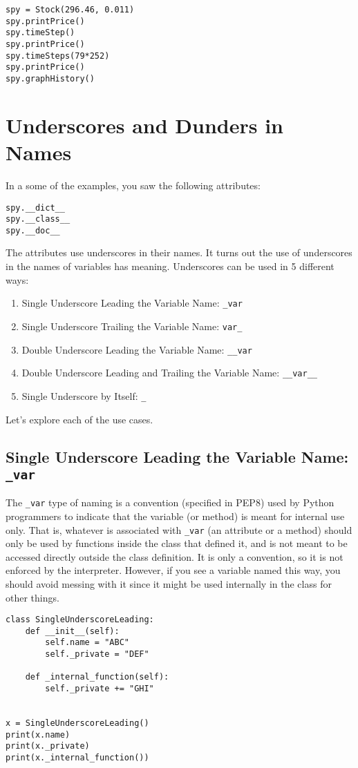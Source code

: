 \documentclass[12pt, a4paper]{article}
\begin{document}
\lstset{language=jupyter-python,label= ,caption= ,captionpos=b,numbers=none}
\begin{lstlisting}
spy = Stock(296.46, 0.011)
spy.printPrice()
spy.timeStep()
spy.printPrice()
spy.timeSteps(79*252)
spy.printPrice()
spy.graphHistory()
\end{lstlisting}
\section{Underscores and Dunders in Names}
\label{sec:orgb3fef4d}
In a some of the examples, you saw the following attributes:
\lstset{language=jupyter-python,label= ,caption= ,captionpos=b,numbers=none}
\begin{lstlisting}
spy.__dict__
spy.__class__
spy.__doc__
\end{lstlisting}
The attributes use underscores in their names.
It turns out the use of underscores in the names of variables has meaning.
Underscores can be used in 5 different ways:
\begin{enumerate}
\item Single Underscore Leading the Variable Name: \texttt{\_var}
\item Single Underscore Trailing the Variable Name: \texttt{var\_}
\item Double Underscore Leading the Variable Name: \texttt{\_\_var}
\item Double Underscore Leading and Trailing the Variable Name: \texttt{\_\_var\_\_}
\item Single Underscore by Itself: \texttt{\_}
\end{enumerate}

Let's explore each of the use cases.
\subsection{Single Underscore Leading the Variable Name: \texttt{\_var}}
\label{sec:org77fd052}
The \texttt{\_var} type of naming is a convention (specified in PEP8) used by Python programmers to indicate that the variable (or method) is meant for internal use only.
That is, whatever is associated with \texttt{\_var} (an attribute or a method) should only be used by functions inside the class that defined it, and is not meant to be accessed directly outside the class definition.
It is only a convention, so it is not enforced by the interpreter.
However, if you see a variable named this way, you should avoid messing with it since it might be used internally in the class for other things.
\lstset{language=jupyter-python,label= ,caption= ,captionpos=b,numbers=none}
\begin{lstlisting}
class SingleUnderscoreLeading:
    def __init__(self):
        self.name = "ABC"
        self._private = "DEF"

    def _internal_function(self):
        self._private += "GHI"


x = SingleUnderscoreLeading()
print(x.name)
print(x._private)
print(x._internal_function())
\end{lstlisting}
\end{document}
